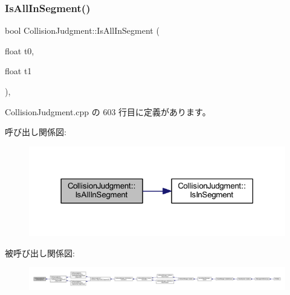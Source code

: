 \subsubsection{\texorpdfstring{Is\+All\+In\+Segment()}{IsAllInSegment()}}
{\footnotesize\ttfamily bool Collision\+Judgment\+::\+Is\+All\+In\+Segment (\begin{DoxyParamCaption}\item[{float}]{t0,  }\item[{float}]{t1 }\end{DoxyParamCaption})\hspace{0.3cm}{\ttfamily [static]}, {\ttfamily [private]}}



 Collision\+Judgment.\+cpp の 603 行目に定義があります。

呼び出し関係図\+:\nopagebreak
\begin{figure}[H]
\begin{center}
\leavevmode
\includegraphics[width=318pt]{class_collision_judgment_a4aa40ec5573967470aeac8f7cb59b67d_cgraph}
\end{center}
\end{figure}
被呼び出し関係図\+:
\nopagebreak
\begin{figure}[H]
\begin{center}
\leavevmode
\includegraphics[width=350pt]{class_collision_judgment_a4aa40ec5573967470aeac8f7cb59b67d_icgraph}
\end{center}
\end{figure}
\mbox{\label{class_collision_judgment_a86d5dd5817ff244d22c9efa3eeecbcb7}} 
